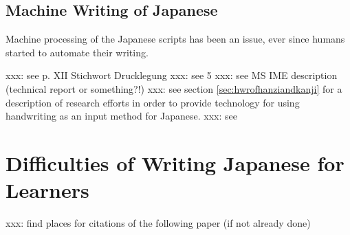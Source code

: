 \subsection{Machine Writing of Japanese}
\label{sec:machinewritingofjapanese}

Machine processing of the Japanese scripts has been an issue, ever since humans
started to automate their writing.

xxx: see  p. XII Stichwort Drucklegung
xxx: see  5
xxx: see MS IME description (technical report or something?!)
xxx: see section \ref{sec:hwrofhanziandkanji} for a description of research 
efforts in order to provide technology for using handwriting as an input method 
for Japanese.
xxx: see 


\section{Difficulties of Writing Japanese for Learners}
\label{sec:writingjapanesedifficulties}


xxx: find places for citations of the following paper (if not already done)
